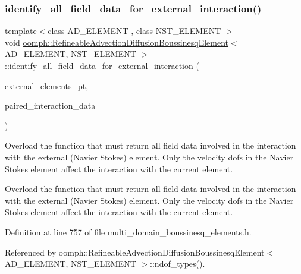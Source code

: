 \subsubsection{\texorpdfstring{identify\+\_\+all\+\_\+field\+\_\+data\+\_\+for\+\_\+external\+\_\+interaction()}{identify\_all\_field\_data\_for\_external\_interaction()}}
{\footnotesize\ttfamily template$<$class A\+D\+\_\+\+E\+L\+E\+M\+E\+NT , class N\+S\+T\+\_\+\+E\+L\+E\+M\+E\+NT $>$ \\
void \hyperlink{classoomph_1_1RefineableAdvectionDiffusionBoussinesqElement}{oomph\+::\+Refineable\+Advection\+Diffusion\+Boussinesq\+Element}$<$ A\+D\+\_\+\+E\+L\+E\+M\+E\+NT, N\+S\+T\+\_\+\+E\+L\+E\+M\+E\+NT $>$\+::identify\+\_\+all\+\_\+field\+\_\+data\+\_\+for\+\_\+external\+\_\+interaction (\begin{DoxyParamCaption}\item[{Vector$<$ std\+::set$<$ Finite\+Element $\ast$$>$ $>$ const \&}]{external\+\_\+elements\+\_\+pt,  }\item[{std\+::set$<$ std\+::pair$<$ Data $\ast$, unsigned $>$ $>$ \&}]{paired\+\_\+interaction\+\_\+data }\end{DoxyParamCaption})}



Overload the function that must return all field data involved in the interaction with the external (Navier Stokes) element. Only the velocity dofs in the Navier Stokes element affect the interaction with the current element. 

Overload the function that must return all field data involved in the interaction with the external (Navier Stokes) element. Only the velocity dofs in the Navier Stokes element affect the interaction with the current element. 

Definition at line 757 of file multi\+\_\+domain\+\_\+boussinesq\+\_\+elements.\+h.



Referenced by oomph\+::\+Refineable\+Advection\+Diffusion\+Boussinesq\+Element$<$ A\+D\+\_\+\+E\+L\+E\+M\+E\+N\+T, N\+S\+T\+\_\+\+E\+L\+E\+M\+E\+N\+T $>$\+::ndof\+\_\+types().

\mbox{\label{classoomph_1_1RefineableAdvectionDiffusionBoussinesqElement_adee164161a19b307d37831c98d256d58}} 
